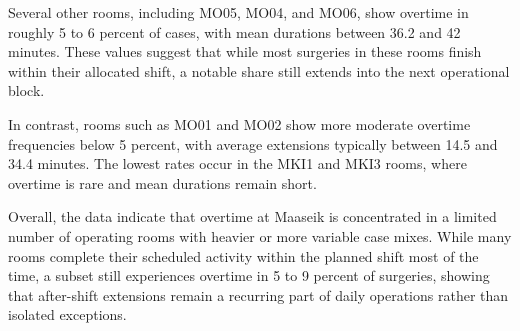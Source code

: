 \documentclass[
]{article}
\begin{document}
Several other rooms, including MO05, MO04, and MO06, show overtime in
roughly 5 to 6 percent of cases, with mean durations between 36.2 and 42
minutes. These values suggest that while most surgeries in these rooms
finish within their allocated shift, a notable share still extends into
the next operational block.

In contrast, rooms such as MO01 and MO02 show more moderate overtime
frequencies below 5 percent, with average extensions typically between
14.5 and 34.4 minutes. The lowest rates occur in the MKI1 and MKI3
rooms, where overtime is rare and mean durations remain short.

Overall, the data indicate that overtime at Maaseik is concentrated in a
limited number of operating rooms with heavier or more variable case
mixes. While many rooms complete their scheduled activity within the
planned shift most of the time, a subset still experiences overtime in 5
to 9 percent of surgeries, showing that after-shift extensions remain a
recurring part of daily operations rather than isolated exceptions.
\end{document}
